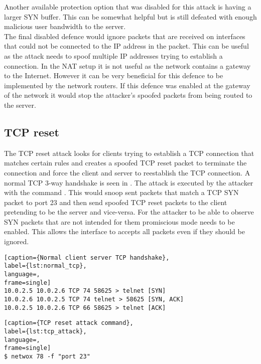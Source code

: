 Another available protection option that was disabled for this attack is having a larger SYN buffer. This can be somewhat helpful but is still defeated with enough malicious user bandwidth to the server. \\
The final disabled defence would ignore packets that are received on interfaces that could not be connected to the IP address in the packet. This can be useful as the attack needs to spoof multiple IP addresses trying to establish a connection. In the NAT setup it is not useful as the network contains a gateway to the Internet. However it can be very beneficial for this defence to be implemented by the network routers. If this defence was enabled at the gateway of the network it would stop the attacker's spoofed packets from being routed to the server.

\subsection{TCP reset}
The TCP reset attack looks for clients trying to establish a TCP connection that matches certain rules and creates a spoofed TCP reset packet to terminate the connection and force the client and server to reestablish the TCP connection. A normal TCP 3-way handshake is seen in . The attack is executed by the attacker with the command . This would snoop sent packets that match a TCP SYN packet to port 23 and then send spoofed TCP reset packets to the client pretending to be the server and vice-versa. For the attacker to be able to observe SYN packets that are not intended for them promiscious mode needs to be enabled. This allows the interface to accepts all packets even if they should be ignored.

\begin{minipage}{\linewidth}
\begin{lstlisting}[caption={Normal client server TCP handshake},
label={lst:normal_tcp},
language=,
frame=single]
10.0.2.5 10.0.2.6 TCP 74 58625 > telnet [SYN] 
10.0.2.6 10.0.2.5 TCP 74 telnet > 58625 [SYN, ACK] 
10.0.2.5 10.0.2.6 TCP 66 58625 > telnet [ACK] 

\end{lstlisting}
\end{minipage}

\begin{minipage}{\linewidth}
\begin{lstlisting}[caption={TCP reset attack command},
label={lst:tcp_attack},
language=,
frame=single]
$ netwox 78 -f "port 23"
\end{lstlisting}
\end{minipage}

